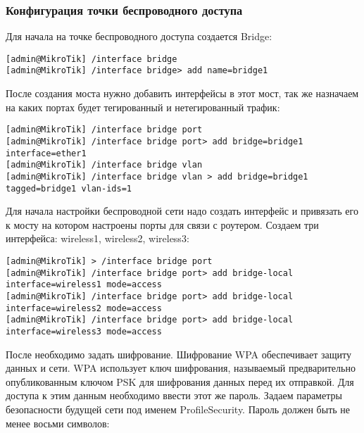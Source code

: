     

\subsubsection{Конфигурация точки беспроводного доступа}

Для начала на точке беспроводного доступа создается Bridge:

\begin{lstlisting}
[admin@MikroTik] /interface bridge
[admin@MikroTik] /interface bridge> add name=bridge1 
\end{lstlisting}

После создания моста нужно добавить интерфейсы в этот мост, так же назначаем на каких портах будет тегированный и нетегированный трафик:

\begin{lstlisting}
[admin@MikroTik] /interface bridge port
[admin@MikroTik] /interface bridge port> add bridge=bridge1 interface=ether1
[admin@MikroTik] /interface bridge vlan
[admin@MikroTik] /interface bridge vlan > add bridge=bridge1 tagged=bridge1 vlan-ids=1
\end{lstlisting}

Для начала настройки беспроводной сети надо создать интерфейс и привязать его к мосту на котором настроены порты для связи с роутером. Создаем три интерфейса: wireless1, wireless2, wireless3:

\begin{lstlisting}
[admin@MikroTik] > /interface bridge port
[admin@MikroTik] /interface bridge port> add bridge-local interface=wireless1 mode=access
[admin@MikroTik] /interface bridge port> add bridge-local interface=wireless2 mode=access
[admin@MikroTik] /interface bridge port> add bridge-local interface=wireless3 mode=access
\end{lstlisting}

После необходимо задать шифрование. Шифрование WPA обеспечивает защиту данных и сети. WPA использует ключ шифрования, называемый предварительно опубликованным ключом PSK для шифрования данных перед их отправкой. Для доступа к этим данным необходимо ввести этот же пароль. Задаем параметры безопасности будущей сети под именем ProfileSecurity. Пароль должен быть не менее восьми символов:

